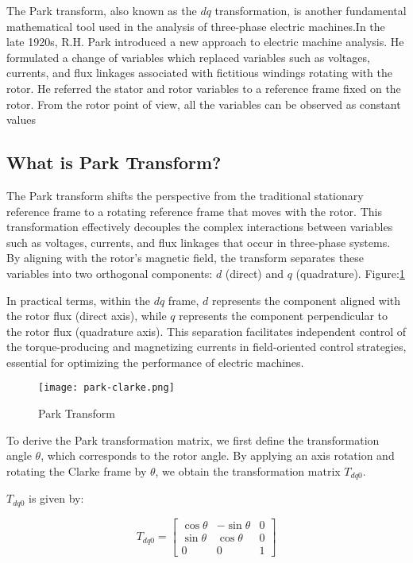 The Park transform, also known as the \( dq \) transformation, is another
fundamental mathematical tool used in the analysis of three-phase electric
machines.In the late 1920s, R.H. Park\cite{R. H. Park} introduced a new
approach to electric machine analysis. He formulated a change of variables
which replaced variables such as voltages, currents, and flux linkages
associated with fictitious windings rotating with the rotor. He referred the
stator and rotor variables to a reference frame fixed on the rotor. From the
rotor point of view, all the variables can be observed as constant values
\subsection{What is Park Transform?}

The Park transform shifts the perspective from the traditional stationary
reference frame to a rotating reference frame that moves with the rotor. This
transformation effectively decouples the complex interactions between variables
such as voltages, currents, and flux linkages that occur in three-phase
systems. By aligning with the rotor's magnetic field, the transform separates
these variables into two orthogonal components: \( d \) (direct) and \( q \)
(quadrature). Figure:\ref{fig:Park Transform}

In practical terms, within the \( dq \) frame, \( d \) represents the component
aligned with the rotor flux (direct axis), while \( q \) represents the
component perpendicular to the rotor flux (quadrature axis). This separation
facilitates independent control of the torque-producing and magnetizing
currents in field-oriented control strategies, essential for optimizing the
performance of electric machines.
\begin{figure}[h]
    \centering
    \texttt{[image: park-clarke.png]}
    \caption{Park Transform}
    \label{fig:Park Transform}
\end{figure}

To derive the Park transformation matrix, we first define the transformation
angle \( \theta \), which corresponds to the rotor angle. By applying an axis
rotation and rotating the Clarke frame by \( \theta \), we obtain the
transformation matrix \( T_{dq0} \).

\( T_{dq0} \) is given by:

\begin{equation*}
    T_{dq0} =
    \begin{bmatrix}
        \cos \theta & -\sin \theta & 0 \\
        \sin \theta & \cos \theta  & 0 \\
        0           & 0            & 1
    \end{bmatrix}
\end{equation*}

